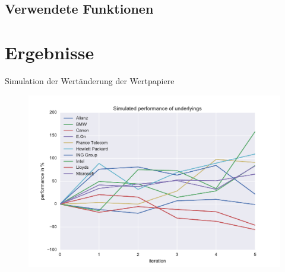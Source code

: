 \subsection{Verwendete Funktionen}
%

\section{Ergebnisse}
\begin{frame}[fragile]{Simulation der Wertänderung der Wertpapiere}
	\vspace{-1cm}
    	\begin{figure}[h!]
    	\includegraphics[scale=0.6]{BSP26_Plot_1.pdf}
		\end{figure}
\end{frame}



